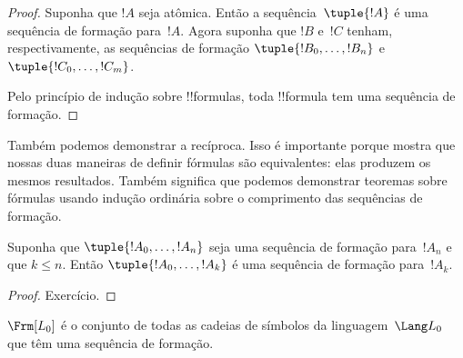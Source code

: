 \documentclass[../../../include/open-logic-section]{subfiles}
\begin{document}
\begin{proof}
Suponha que $!A$ seja atômica. Então a sequência~$\tuple{!A}$ é uma
sequência de formação para~$!A$.
%
Agora suponha que $!B$ e~$!C$ tenham, respectivamente, as sequências de
formação $\tuple{!B_0,\dotsc,!B_n}$ e $\tuple{!C_0,\dotsc,!C_m}$.
%
\begin{enumerate}
\end{enumerate}
Pelo princípio de indução sobre !!{formula}s, toda !!{formula} tem uma
sequência de formação.
\end{proof}

Também podemos demonstrar a recíproca. Isso é importante porque mostra que
nossas duas maneiras de definir fórmulas são equivalentes: elas produzem os
mesmos resultados. Também significa que podemos demonstrar teoremas sobre
fórmulas usando indução ordinária sobre o comprimento das sequências de
formação.

\begin{lem}
Suponha que $\tuple{!A_0,\dotsc,!A_n}$ seja uma sequência de formação
para~$!A_n$ e que $k \leq n$. Então $\tuple{!A_0,\dotsc,!A_k}$ é uma
sequência de formação para~$!A_k$.
\end{lem}

\begin{proof}
Exercício.
\end{proof}

\begin{thm}
$\Frm[L_0]$ é o conjunto de todas as cadeias de símbolos da
linguagem~$\Lang L_0$ que têm uma sequência de formação.
\end{thm}
\end{document}
